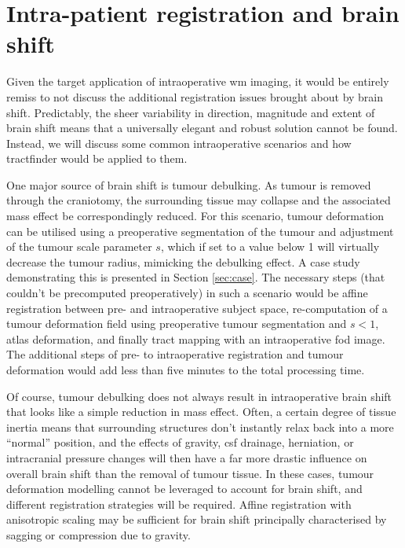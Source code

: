 \section{Intra-patient registration and brain shift}

Given the target application of intraoperative \gls{wm} imaging, it would be entirely remiss to not discuss the additional registration issues brought about by brain shift.
Predictably, the sheer variability in direction, magnitude and extent of brain shift means that a universally elegant and robust solution cannot be found.
Instead, we will discuss some common intraoperative scenarios and how tractfinder would be applied to them.

One major source of brain shift is tumour debulking.
As tumour is removed through the craniotomy, the surrounding tissue may collapse and the associated mass effect be correspondingly reduced.
For this scenario, tumour deformation can be utilised using a preoperative segmentation of the tumour and adjustment of the tumour scale parameter $s$, which if set to a value below 1 will virtually decrease the tumour radius, mimicking the debulking effect.
A case study demonstrating this is presented in Section \ref{sec:case}.
The necessary steps (that couldn't be precomputed preoperatively) in such a scenario would be affine registration between pre- and intraoperative subject space, re-computation of a tumour deformation field using preoperative tumour segmentation and $s<1$, atlas deformation, and finally tract mapping with an intraoperative \gls{fod} image.
The additional steps of pre- to intraoperative registration and tumour deformation would add less than five minutes to the total processing time.

Of course, tumour debulking does not always result in intraoperative brain shift that looks like a simple reduction in mass effect.
Often, a certain degree of tissue inertia means that surrounding structures don't instantly relax back into a more ``normal'' position, and the effects of gravity, \gls{csf} drainage, herniation, or intracranial pressure changes will then have a far more drastic influence on overall brain shift than the removal of tumour tissue.
In these cases, tumour deformation modelling cannot be leveraged to account for brain shift, and different registration strategies will be required.
Affine registration with anisotropic scaling may be sufficient for brain shift principally characterised by sagging or compression due to gravity.

